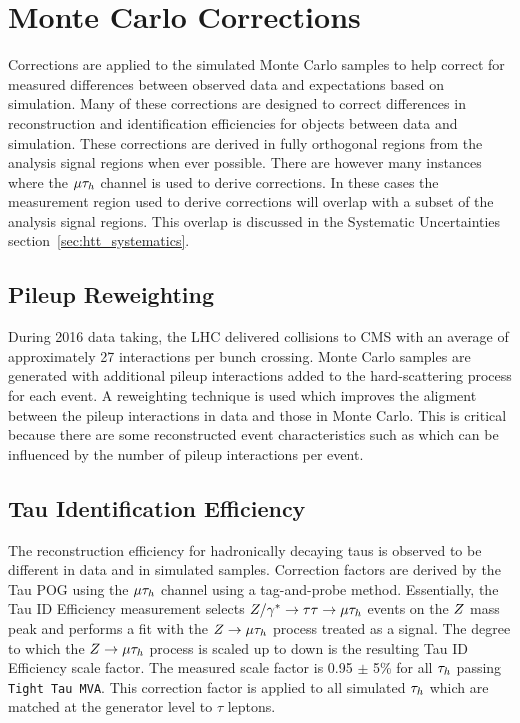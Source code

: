 \pagebreak

\section{Monte Carlo Corrections}
\label{sec:mc_corrections}

Corrections are applied to the simulated Monte Carlo samples to help correct for measured differences
between observed data and expectations based on simulation. Many of these corrections are designed
to correct differences in reconstruction and identification efficiencies for objects between data
and simulation. These corrections are derived in
fully orthogonal regions from the analysis signal regions when ever possible. There are however many
instances where the $\mu\tau_{h}$ channel is used to derive corrections. In these cases the measurement
region used to derive corrections will overlap with a subset of the analysis signal regions. This
overlap is discussed in the Systematic Uncertainties section~\ref{sec:htt_systematics}.


\subsection{Pileup Reweighting}
During 2016 data taking, the LHC delivered \pp collisions to CMS with an average of approximately 27
interactions per bunch crossing. Monte Carlo samples are generated with additional pileup interactions
added to the hard-scattering process for each event. A reweighting technique is used which improves
the aligment between the pileup interactions in data and those in Monte Carlo. This is critical because
there are some reconstructed event characteristics such as \etvecmiss which can be influenced by the
number of pileup interactions per event.


\subsection{Tau Identification Efficiency}
\label{sec:htt_tau_id_eff}
The reconstruction efficiency for hadronically decaying taus is observed to be different in data and in simulated samples.
Correction factors are derived by the Tau POG using the $\mu\tau_{h}$ channel using a tag-and-probe method. Essentially,
the Tau ID Efficiency measurement selects $Z/\gamma^*\to\tau\tau\to\mu\tau_{h}$ events on the $Z$
mass peak and performs a fit with the $Z\to\mu\tau_{h}$ process treated as a signal. The degree
to which the $Z\to\mu\tau_{h}$ process is scaled up to down is the resulting Tau ID Efficiency
scale factor. The measured scale factor is 0.95 $\pm$ 5\% for all $\tau_{h}$ passing \texttt{Tight Tau MVA}.
This correction factor is applied to all simulated $\tau_{h}$ which are matched at the generator
level to $\tau$ leptons.


